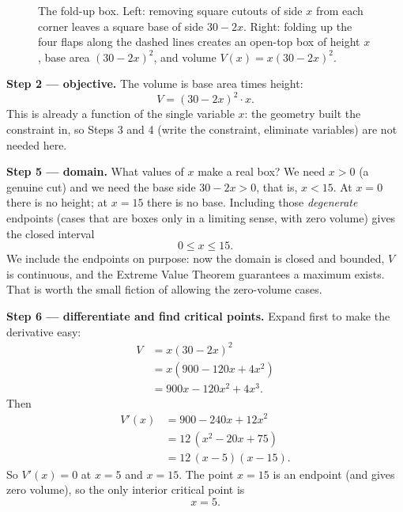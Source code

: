 \begin{figure}[H]
\caption{The fold-up box. Left: removing square cutouts of side $x$ from each corner
leaves a square base of side $30-2x$. Right: folding up the four flaps along the dashed
lines creates an open-top box of height $x$, base area $(30-2x)^2$, and volume
$V(x)=x(30-2x)^2$.}
\label{ch17:fig-box}
\end{figure}

\textbf{Step 2 --- objective.} The volume is base area times height:
\[
V = (30-2x)^2 \cdot x.
\]
This is already a function of the single variable $x$: the geometry built the
constraint in, so Steps 3 and 4 (write the constraint, eliminate variables) are not
needed here.

\textbf{Step 5 --- domain.} What values of $x$ make a real box? We need $x>0$ (a
genuine cut) and we need the base side $30-2x>0$, that is, $x<15$. At $x=0$ there is no
height; at $x=15$ there is no base. Including those \emph{degenerate} endpoints (cases
that are boxes only in a limiting sense, with zero volume) gives the closed interval
\[
0 \le x \le 15.
\]
We include the endpoints on purpose: now the domain is closed and bounded, $V$ is
continuous, and the Extreme Value Theorem guarantees a maximum exists. That is worth
the small fiction of allowing the zero-volume cases.

\textbf{Step 6 --- differentiate and find critical points.} Expand first to make the
derivative easy:
\begin{align*}
V &= x(30-2x)^2 \\
  &= x(900 - 120x + 4x^2) \\
  &= 900x - 120x^2 + 4x^3.
\end{align*}
Then
\begin{align*}
V'(x) &= 900 - 240x + 12x^2 \\
      &= 12\,(x^2 - 20x + 75) \\
      &= 12\,(x-5)(x-15).
\end{align*}
So $V'(x)=0$ at $x=5$ and $x=15$. The point $x=15$
is an endpoint (and gives zero volume), so the only interior critical point is
\[
x = 5.
\]

